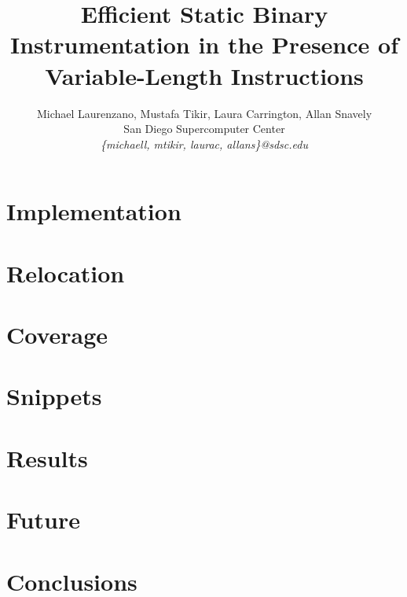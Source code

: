 \documentclass[a4paper,11pt,leqno,notitlepage,twocolumn]{article}
\begin{document}
\title{Efficient Static Binary Instrumentation in the Presence of Variable-Length Instructions}
\author{Michael Laurenzano, Mustafa Tikir, Laura Carrington, Allan Snavely\\
San Diego Supercomputer Center\\
\it{\{michaell, mtikir, laurac, allans\}@sdsc.edu}}
\date{}
\maketitle

\begin{abstract}

\end{abstract}

\label{Section:Introduction}


\label{Section:Implementation}
\section{Implementation}


\label{Section:Relocation}
\section{Relocation}


\label{Section:Coverage}
\section{Coverage}


\label{Section:Snippets}
\section{Snippets}
%

\label{Section:Results}
\section{Results}
%

\label{Section:Future}
\section{Future}


\label{Section:Conclusions}
\section{Conclusions}
%



\end{document}
